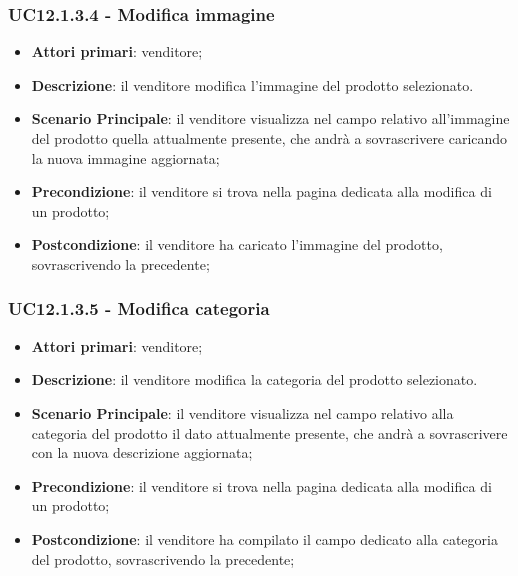 \subsubsection{UC12.1.3.4 - Modifica immagine}
\begin{itemize}
\item \textbf{Attori primari}: venditore;
\item \textbf{Descrizione}: il venditore modifica l'immagine del prodotto selezionato.
\item \textbf{Scenario Principale}: il venditore visualizza nel campo relativo all'immagine del prodotto quella attualmente presente, che andrà a sovrascrivere caricando la nuova immagine aggiornata;
\item \textbf{Precondizione}: il venditore si trova nella pagina dedicata alla modifica di un prodotto;
\item \textbf{Postcondizione}: il venditore ha caricato l'immagine del prodotto, sovrascrivendo la precedente;
\end{itemize}

\subsubsection{UC12.1.3.5 - Modifica categoria}
\begin{itemize}
\item \textbf{Attori primari}: venditore;
\item \textbf{Descrizione}: il venditore modifica la categoria del prodotto selezionato.
\item \textbf{Scenario Principale}: il venditore visualizza nel campo relativo alla categoria del prodotto il dato attualmente presente, che andrà a sovrascrivere con la nuova descrizione aggiornata;
\item \textbf{Precondizione}: il venditore si trova nella pagina dedicata alla modifica di un prodotto;
\item \textbf{Postcondizione}: il venditore ha compilato il campo dedicato alla categoria del prodotto, sovrascrivendo la precedente;
\end{itemize}

